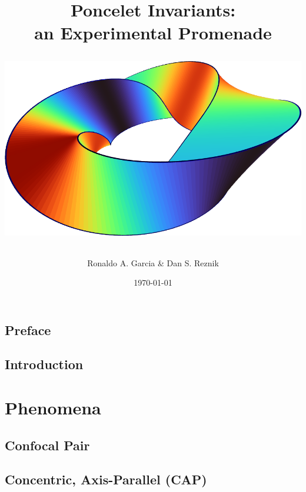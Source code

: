 \documentclass{book}
\begin{document}

\title{
{\bf Poncelet Invariants:}\\
{\bf an Experimental Promenade}
\author{Ronaldo A. Garcia \& Dan S. Reznik} 
\date{\today}
 \vfill
{\includegraphics[totalheight=2.2in]{001_front_cover.png}}
}


\maketitle

\chapter*{Preface}


\chapter{Introduction}
\label{chap:01-intro}


\part{ Phenomena}

\chapter{Confocal Pair}
\label{chap:02-n3-confocal}


\chapter{Concentric, Axis-Parallel (CAP)}
\label{chap:03-n3-cap}

\end{document}
